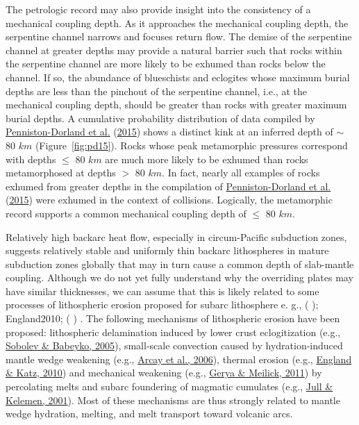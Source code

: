 \documentclass[draft,linenumbers]{agujournal2018}
\providecommand{\DIFdeltex}[1]{{\protect\color{red} \scriptsize #1}} %
\providecommand{\DIFdelbegin}{} %
\providecommand{\DIFdelend}{} %
\providecommand{\DIFdel}[1]{\texorpdfstring{\DIFdeltex{#1}}{}} %
\begin{document}
The petrologic record may also provide insight into the consistency of a
mechanical coupling depth. As it approaches the mechanical coupling
depth, the serpentine channel narrows and focuses return flow. The
demise of the serpentine channel at greater depths may provide a natural
barrier such that rocks within the serpentine channel are more likely to
be exhumed than rocks below the channel. If so, the abundance of
blueschists and eclogites whose maximum burial depths are less than the
pinchout of the serpentine channel, i.e., at the mechanical coupling
depth, should be greater than rocks with greater maximum burial depths.
A cumulative probability distribution of data compiled by
\protect\hyperlink{ref-Penniston2015}{Penniston-Dorland et al.}
(\protect\hyperlink{ref-Penniston2015}{2015}) shows a distinct kink at
an inferred depth of \(\sim\) 80 \(km\) (Figure~\ref{fig:pd15}). Rocks
whose peak metamorphic pressures correspond with depths \(\leq\) 80
\(km\) are much more likely to be exhumed than rocks metamorphosed at
depths \(>\) 80 \(km\). In fact, nearly all examples of rocks exhumed
from greater depths in the compilation of
\protect\hyperlink{ref-Penniston2015}{Penniston-Dorland et al.}
(\protect\hyperlink{ref-Penniston2015}{2015}) were exhumed in the
context of collisions. Logically, the metamorphic record supports a
common mechanical coupling depth of \(\leq\) 80 \(km\).

Relatively high backarc heat flow, especially in circum-Pacific
subduction zones, suggests relatively stable and uniformly thin backarc
lithospheres in mature subduction zones globally that may in turn cause
a common depth of slab-mantle coupling. Although we do not yet fully
understand why the overriding plates may have similar thicknesses, we
can assume that this is likely related to some processes of lithospheric
erosion proposed for subarc lithosphere\DIFdelbegin %
\DIFdel{e. g.,
}%
\DIFdel{(}%
\DIFdel{); England2010;
}%
\DIFdel{(}%
\DIFdel{)}%
\DIFdelend . The following mechanisms of
lithospheric erosion have been proposed: lithospheric delamination
induced by lower crust eclogitization (e.g.,
\protect\hyperlink{ref-Sobolev2005}{Sobolev \& Babeyko, 2005}),
small-scale convection caused by hydration-induced mantle wedge
weakening (e.g., \protect\hyperlink{ref-Arcay2006}{Arcay et al., 2006}),
thermal erosion (e.g., \protect\hyperlink{ref-England2010}{England \&
Katz, 2010}) and mechanical weakening (e.g.,
\protect\hyperlink{ref-Gerya2011}{Gerya \& Meilick, 2011}) by
percolating melts and subarc foundering of magmatic cumulates (e.g.,
\protect\hyperlink{ref-Jull2001}{Jull \& Kelemen, 2001}). Most of these
mechanisms are thus strongly related to mantle wedge hydration, melting,
and melt transport toward volcanic arcs.
\end{document}
